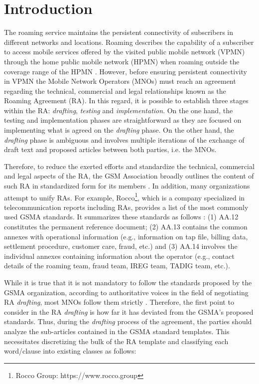 \section{Introduction}\label{intro}
The roaming service maintains the persistent connectivity of subscribers in different networks and locations. Roaming describes the capability of a subscriber to access mobile services offered by the visited public mobile network (VPMN) through the home public mobile network (HPMN) when roaming outside the coverage range of the HPMN \cite{Tanaka2013}. However, before ensuring persistent connectivity in VPMN the Mobile Network Operators (MNOs) must reach an agreement regarding the technical, commercial and legal relationships known as the Roaming Agreement (RA). In this regard, it is possible to establish three stages within the RA: \textit{drafting}, \textit{testing} and \textit{implementation}. On the one hand, the testing and implementation phases are straightforward as they are focused on implementing what is agreed on the \textit{drafting} phase. On the other hand, the \textit{drafting} phase is ambiguous and involves multiple iterations of the exchange of draft text and proposed articles between both parties, i.e. the MNOs. 

Therefore, to reduce the exerted efforts and standardize the technical, commercial and legal aspects of the RA, the GSM Association broadly outlines the content of such RA in standardized form for its members \cite{Ferwerda2018}. 
In addition, many organizations attempt to unify RAs. For example, Rocco\footnote{Rocco Group: https://www.rocco.group}, which is a company specialized in telecommunication reports including RAs, provides a list of the most commonly used GSMA standards. It summarizes these standards as follows \cite{ROCCO2017}: (1) AA.12 constitutes the permanent reference document; (2) AA.13 contains the common annexes with operational information (e.g., information on tap file, billing data, settlement procedure, customer care, fraud, etc.) and (3) AA.14 involves the individual annexes containing information about the operator (e.g., contact details of the roaming team, fraud team, IREG team, TADIG team, etc.).

While it is true that it is not mandatory to follow the standards proposed by the GSMA organization, according to authoritative voices in the field of negotiating RA \textit{drafting}, most MNOs follow them strictly \cite{ROCCO2017a}. Therefore, the first point to consider in the RA \textit{drafting} is how far it has deviated from the GSMA's proposed standards. Thus, during the \textit{drafting} process of the agreement, the parties should analyze the sub-articles contained in the GSMA standard templates. This necessitates discretizing the bulk of the RA template and classifying each word/clause into existing classes as follows:

